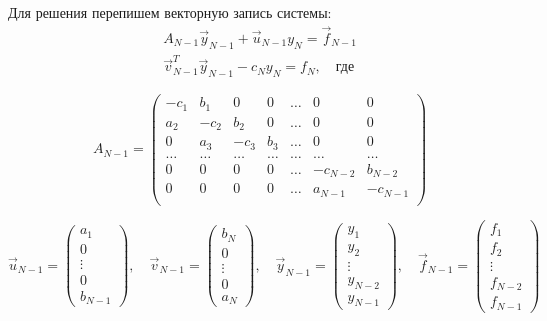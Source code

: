 \documentclass[titlepage]{article}
\def\l{\left}
\def\r{\right}
\begin{document}
Для решения перепишем векторную запись системы:
\begin{gather*}
	A_{N-1}\vec y_{N-1} + \vec u_{N-1}y_N = \vec f_{N-1} \\
	\vec v_{N-1}^T \vec y_{N-1} - c_Ny_N = f_N, \quad \text{где} \tag{1}
\end{gather*}

\begin{equation*}
	A_{N-1} = \begin{pmatrix}
		-c_1 & b_1 & 0 & 0 & \dots & 0 & 0 \\
		a_2 & -c_2 & b_2 & 0 & \dots & 0 & 0 \\
		0 & a_3 & -c_3 & b_3 & \dots & 0 & 0 \\
		\dots & \dots & \dots & \dots & \dots & \dots & \dots \\
		0 & 0 & 0 & 0 & \dots & -c_{N-2} & b_{N-2} \\
		0 & 0 & 0 & 0 & \dots & a_{N-1} & -c_{N-1} \\
	\end{pmatrix}
\end{equation*}

\begin{equation*}
	\vec u_{N-1} = \l(\begin{matrix} a_1 \\ 0 \\ \vdots \\ 0 \\ b_{N-1} \end{matrix}\r), \quad 
	\vec v_{N-1} = \l(\begin{matrix} b_N \\ 0 \\ \vdots \\ 0 \\ a_{N} \end{matrix}\r), \quad
	\vec y_{N-1} = \l(\begin{matrix} y_1 \\ y_2 \\ \vdots \\ y_{N-2} \\ y_{N-1} \end{matrix}\r), \quad
	\vec f_{N-1} = \l(\begin{matrix} f_1 \\ f_2 \\ \vdots \\ f_{N-2} \\ f_{N-1} \end{matrix}\r)
\end{equation*}
\end{document}
